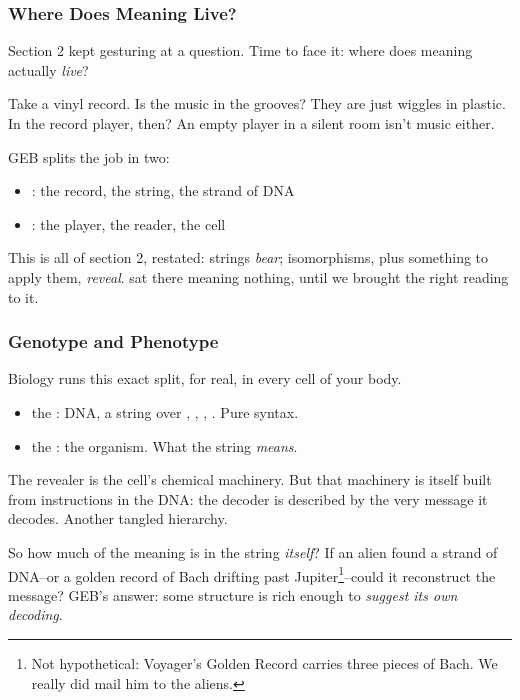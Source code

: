\documentclass[aspectratio=169]{beamer}
\newcommand{\tm}[1]{\text{\color{textColor}\texttt{#1}}}
\begin{document}
\begin{frame}[fragile]
  \frametitle{Where Does Meaning Live?}

  Section 2 kept gesturing at a question. Time to face it: where does
  meaning actually \textit{live}?

  \pause
  \vspace{\fill}

  Take a vinyl record. Is the music in the grooves? They are just
  wiggles in plastic. In the record player, then? An empty player in a
  silent room isn't music either.

  \pause
  \vspace{\fill}

  GEB splits the job in two:

  \begin{itemize}
    \item {}: the record, the string, the
      strand of DNA
    \item {}: the player, the reader, the
      cell
  \end{itemize}

  \pause
  \vspace{\fill}

  This is all of section 2, restated: strings \textit{bear};
  isomorphisms, plus something to apply them, \textit{reveal}.
   sat there meaning nothing, until we brought the
  right reading to it.
\end{frame}

\begin{frame}[fragile]
  \frametitle{Genotype and Phenotype}

  Biology runs this exact split, for real, in every cell of your body.

  \pause
  \vspace{\fill}

  \begin{itemize}
    \item the : DNA, a string over \tm{A}, \tm{C},
      \tm{G}, \tm{T}. Pure syntax.
    \item the : the organism. What the string
      \textit{means}.
  \end{itemize}

  \pause
  \vspace{\fill}

  The revealer is the cell's chemical machinery. But that machinery
  is itself built from instructions in the DNA: the decoder is
  described by the very message it decodes. Another tangled hierarchy.

  \pause
  \vspace{\fill}

  So how much of the meaning is in the string \textit{itself}? If an
  alien found a strand of DNA--or a golden record of Bach drifting
  past Jupiter\footnote{Not hypothetical: Voyager's Golden Record
  carries three pieces of Bach. We really did mail him to the
  aliens.}--could it reconstruct the message? GEB's answer: some
  structure is rich enough to \textit{suggest its own decoding}.
\end{frame}
\end{document}
